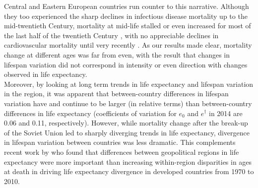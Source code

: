 \documentclass{article}
\begin{document}
\begin{spacing}{1.5}
Central and Eastern European countries run counter to this narrative. Although they too experienced the sharp declines in infectious disease mortality up to the mid-twentieth Century, mortality at mid-life stalled or even increased for most of the last half of the twentieth Century \citep{mckee2001}, with no appreciable declines in cardiovascular mortality until very recently \citep{caselli2002epidemiologic, grigoriev2014recent,mesle2004mortality,timonin2017}. As our results made clear, mortality change at different ages was far from even, with the result that changes in lifespan variation did not correspond in intensity or even direction with changes observed in life expectancy.\\

Moreover, by looking at long term trends in life expectancy and lifespan variation in the region, it was apparent that between-country differences in lifespan variation have and continue to be larger (in relative terms) than between-country differences in life expectancy (coefficients of variation for $e_0$ and $e^\dagger$ in 2014 are 0.06 and 0.11, respectively). However, while mortality change after the break-up of the Soviet Union led to sharply diverging trends in life expectancy, divergence in lifespan variation between countries was less dramatic. This complements recent work by \citet{timonin2016disparities} who found that differences between geopolitical regions in life expectancy were more important than increasing within-region disparities in ages at death in driving life expectancy divergence in developed countries from 1970 to 2010.\\


\end{spacing}
\end{document}
